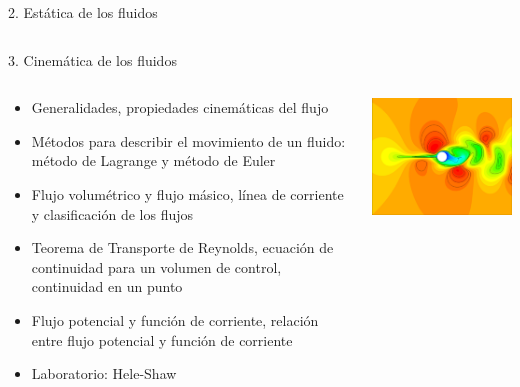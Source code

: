 \documentclass [xcolor=svgnames, t] {beamer}
\begin{document}
\begin{frame}{2. Est\'atica de los fluidos}
\begin{columns}
\begin{center}
\end{center}
\end{columns}
\end{frame}

\begin{frame}{3. Cinem\'atica de los fluidos}
\vspace{-0.9cm}
\begin{columns}
\begin{exampleblock}{}
\begin{itemize}
\item Generalidades, propiedades cinemáticas del flujo
\item Métodos para describir el movimiento de un fluido: método de Lagrange y método de Euler
\item Flujo volumétrico y flujo másico, línea de corriente y clasificación de los flujos
\item Teorema de Transporte de Reynolds, ecuación de continuidad para un volumen de control, continuidad en un punto
\item Flujo potencial y función de corriente, relación entre flujo potencial y función de corriente
\item \alert{Laboratorio: Hele-Shaw}
\end{itemize}
\end{exampleblock}
\begin{center}
\includegraphics[width=\textwidth]{fmk}
\end{center}
\end{columns}
\end{frame}
\end{document}

